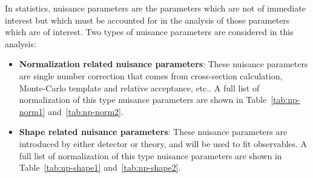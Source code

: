 \par In statistics, nuisance parameters are the parameters which are not of immediate interest but which must be accounted for in the analysis of those parameters which are of interest. 
Two types of nuisance parameters are considered in this analysis:
\begin{itemize}
    \item \textbf{Normalization related nuisance parameters}: These nuisance parameters are single number correction that comes from cross-section calculation, Monte-Carlo template and relative acceptance, etc.. 
    A full list of normalization of this type nuisance parameters are shown in Table~\ref{tab:np-norm1} and~\ref{tab:np-norm2}.
    \item \textbf{Shape related nuisance parameters}: These nuisance parameters are introduced by either detector or theory, and will be used to fit observables. 
    A full list of normalization of this type nuisance parameters are shown in Table~\ref{tab:np-shape1} and~\ref{tab:np-shape2}.
\end{itemize}

